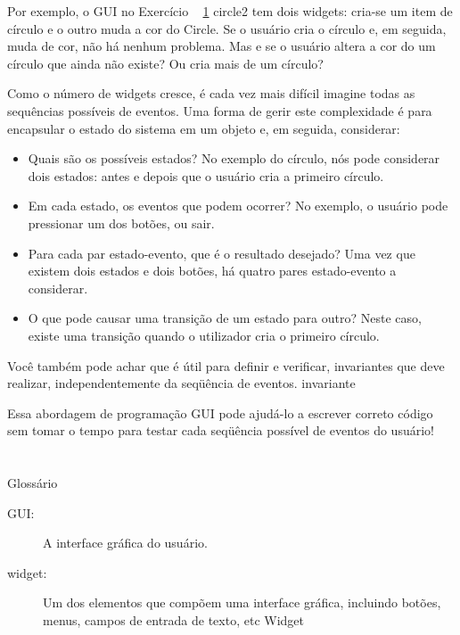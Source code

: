 \documentclass[10pt]{book}
\begin{document}
\begin{exercise}
\begin{v erbatim}
Por exemplo, o GUI no Exercício ~ \ref {} circle2 tem dois widgets:
cria-se um item de círculo e o outro muda a cor do
Circle. Se o usuário cria o círculo e, em seguida, muda de cor,
não há nenhum problema. Mas e se o usuário altera a cor do
um círculo que ainda não existe? Ou cria mais de um círculo?

Como o número de widgets cresce, é cada vez mais difícil
imagine todas as sequências possíveis de eventos. Uma forma de gerir este
complexidade é para encapsular o estado do sistema em um objeto
e, em seguida, considerar:

\begin{itemize}

\item Quais são os possíveis estados? No exemplo do círculo, nós
pode considerar dois estados: antes e depois que o usuário cria a
primeiro círculo.

\item Em cada estado, os eventos que podem ocorrer? No exemplo,
o usuário pode pressionar um dos botões, ou sair.

\item Para cada par estado-evento, que é o resultado desejado?
Uma vez que existem dois estados e dois botões, há quatro
pares estado-evento a considerar.

\item O que pode causar uma transição de um estado para outro?
Neste caso, existe uma transição quando o utilizador cria
o primeiro círculo.

\end{itemize}

Você também pode achar que é útil para definir e verificar, invariantes que
deve realizar, independentemente da seqüência de eventos.
\index{} invariante

Essa abordagem de programação GUI pode ajudá-lo a escrever correto
código sem tomar o tempo para testar cada seqüência possível
de eventos do usuário!


\section{} Glossário

\begin{description}

\item[GUI:] A interface gráfica do usuário.

\item[widget:] Um dos elementos que compõem uma interface gráfica, incluindo
botões, menus, campos de entrada de texto, etc 
\index{} Widget


\end{description}
\end{v erbatim}
\end{exercise}
\end{document}
